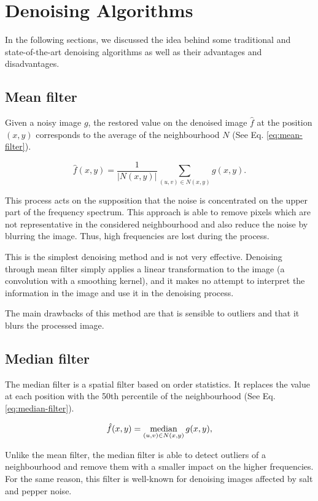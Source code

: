 \section{Denoising Algorithms} \label{sc:state-of-the-art}
In the following sections, we discussed the idea behind some traditional and state-of-the-art denoising algorithms as well as their advantages and disadvantages.

\subsection{Mean filter}
Given a noisy image $g$, the restored value on the denoised image $\hat{f}$ at the position $(x, y)$ corresponds to the average of the neighbourhood $N$ (See Eq. \ref{eq:mean-filter}).

\begin{equation}
    \hat{f}(x, y) = \frac{1}{|N(x, y)|}\sum_{(u, v) \in N(x, y)}{g(x, y)}.
    \label{eq:mean-filter}
\end{equation}

This process acts on the supposition that the noise is concentrated on the upper part of the frequency spectrum. This approach is able to remove pixels which are not representative in the considered neighbourhood and also reduce the noise by blurring the image. Thus, high frequencies are lost during the process.

This is the simplest denoising method and is not very effective. Denoising through mean filter simply applies a linear transformation to the image (a convolution with a smoothing kernel), and it makes no attempt to interpret the information in the image and use it in the denoising process.

The main drawbacks of this method are that is sensible to outliers and that it blurs the processed image.

\subsection{Median filter}
The median filter is a spatial filter based on order statistics. It replaces the value at each position with the 50th percentile of the neighbourhood (See Eq. \ref{eq:median-filter}). 

\begin{equation}
    \hat{f}(x, y) = \operatorname*{median}\limits_{(u, v) \in N(x, y)}{g(x, y)},
    \label{eq:median-filter}
\end{equation}

Unlike the mean filter, the median filter is able to detect outliers of a neighbourhood and remove them with a smaller impact on the higher frequencies. For the same reason, this filter is well-known for denoising images affected by salt and pepper noise. 

